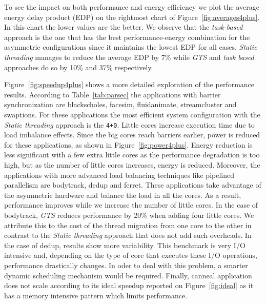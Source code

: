 To see the impact on both performance and energy efficiency we plot the average energy delay product (EDP) on the rightmost chart of Figure~\ref{fig:averages4plus}. In this chart the lower values are the better. We observe that the \emph{task-based} approach is the one that has the best performance-energy combination for the asymmetric configurations since it maintains the lowest EDP for all cases. \emph{Static threading} manages to reduce the average EDP by 7\% while \emph{GTS} and \emph{task based} approaches do so by 10\% and 37\% respectively.

Figure~\ref{fig:speedup4plus} shows a more detailed exploration of the performance results. According to Table~\ref{tab:parsec} the applications with barrier synchronization are blackscholes, facesim, fluidanimate, streamcluster and swaptions. For these applications the most efficient system configuration with the \emph{Static threading} approach is the \texttt{4+0}. Little cores increase execution time due to load imbalance effects. Since the big cores reach barriers earlier, power is reduced for these applications, as shown in Figure~\ref{fig:power4plus}. Energy reduction is less significant with a few extra little cores as the performance degradation is too high, but as the number of little cores increases, energy is reduced. Moreover, the applications with more advanced load balancing techniques like pipelined parallelism are bodytrack, dedup and ferret. These applications take advantage of the asymmetric hardware and balance the load in all the cores. As a result, performance improves while we increase the number of little cores. In the case of bodytrack, \emph{GTS} reduces performance by 20\% when adding four little cores. We attribute this to the cost of the thread migration from one core to the other in contrast to the \emph{Static threading} approach that does not add such overheads. 
In the case of dedup, results show more variability. This benchmark is very I/O intensive and, depending on the type of core that executes these I/O operations, performance drastically changes. In oder to deal with this problem, a smarter dynamic scheduling mechanism would be required. Finally, canneal application does not 
scale according to its ideal speedup reported on Figure~\ref{fig:ideal} as it has a memory intensive pattern which limits performance.

